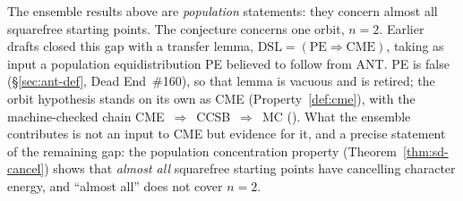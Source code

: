 The ensemble results above are \emph{population} statements: they
concern almost all squarefree starting points.  The conjecture concerns
one orbit, $n = 2$.  Earlier drafts closed this gap with a transfer
lemma, $\mathrm{DSL} = (\mathrm{PE} \Rightarrow \mathrm{CME})$, taking as
input a population equidistribution PE believed to follow from ANT\@.
PE is false (\S\ref{sec:ant-def}, Dead End~\#160), so that lemma is
vacuous and is retired; the orbit hypothesis stands on its own as
CME (Property~\ref{def:cme}), with the machine-checked chain
CME~$\Rightarrow$~CCSB~$\Rightarrow$~MC
().  What the ensemble
contributes is not an input to CME but evidence for it, and a precise
statement of the remaining gap: the population concentration
property (Theorem~\ref{thm:sd-cancel}) shows that \emph{almost all}
squarefree starting points have cancelling character energy, and
``almost all'' does not cover $n = 2$.

